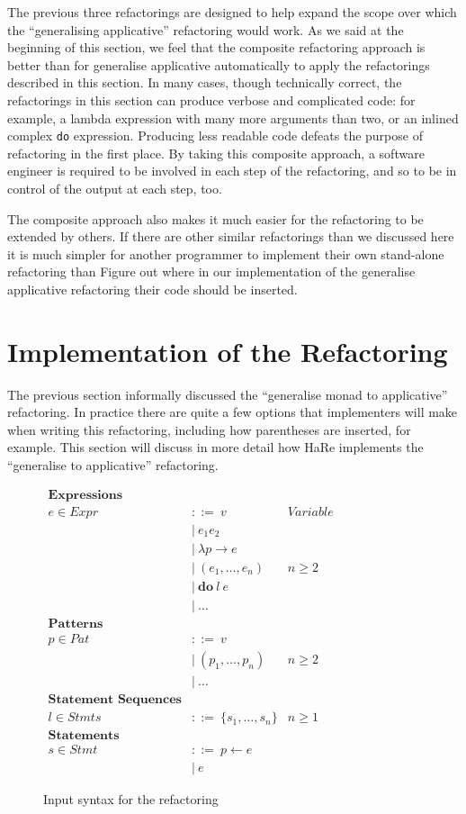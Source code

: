 The previous three refactorings are designed to help expand the scope over which the ``generalising applicative'' refactoring would work. As we said at the beginning of this section, we feel that the composite refactoring approach is better than for generalise applicative automatically to apply the refactorings described in this section. In many cases, though technically correct, the refactorings in this section can produce verbose and complicated code: for example, a lambda expression with many more arguments than two, or an inlined complex \texttt{do} expression. Producing less readable code  defeats the purpose of refactoring in the first place. By taking this composite approach,  a software engineer is required to be involved in each step of the refactoring, and so to be in control of the output at each step, too. 

The composite approach also makes it much easier for the refactoring to be extended by others. If there are other similar refactorings than we discussed here it is much simpler for another programmer to implement their own stand-alone refactoring  than Figure out where in our implementation of the generalise applicative refactoring their code should be inserted. 

\section{Implementation of the Refactoring}
\label{sec:refacImp}

The previous section informally discussed the ``generalise monad to applicative'' refactoring. In practice there are quite a few options that implementers will make when writing this refactoring, including how parentheses are inserted, for example. This section will discuss in more detail how HaRe implements the ``generalise to applicative'' refactoring.

\begin{figure}[t]
	\begin{math}
		\begin{aligned}
\textbf{Expressions}\\
e \in Expr\ &::=\ v\qquad &Variable\\
&|\ e_1 e_2\\
&|\ \lambda p \rightarrow e\\
&|\ (e_1, \ldots, e_n) &n \geq 2\\
&|\ \textbf{do}\ l\ e\\
&|\ \ldots\\
\textbf{Patterns}\\
p \in Pat\ &::=\ v\\
&|\ (p_1, \ldots, p_n) &n \geq 2\\
&|\ \ldots \\
\textbf{Statement Sequences}\\
l \in Stmts\ &::=\ \{s_1, \ldots, s_n\} &n \geq 1\\
\textbf{Statements}\\
s \in Stmt\ &::=\ p \leftarrow e\\
&|\ e
		\end{aligned}
	\end{math}
	\caption{Input syntax for the refactoring}
	\label{syntax}
\end{figure}

